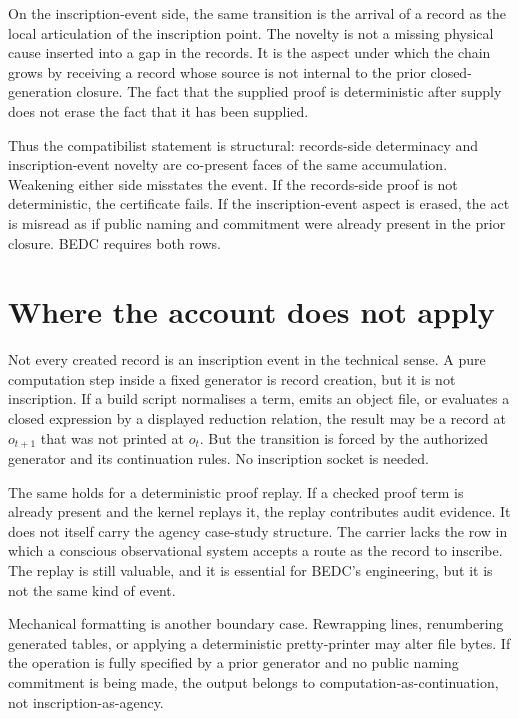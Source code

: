 On the inscription-event side, the same transition is the arrival of a
record as the local articulation of the inscription point.  The novelty is
not a missing physical cause inserted into a gap in the records.  It is the
aspect under which the chain grows by receiving a record whose source is not
internal to the prior closed-generation closure.  The fact that the supplied
proof is deterministic after supply does not erase the fact that it has been
supplied.

Thus the compatibilist statement is structural:
records-side determinacy and inscription-event novelty are co-present faces
of the same accumulation.  Weakening either side misstates the event.  If the
records-side proof is not deterministic, the certificate fails.  If the
inscription-event aspect is erased, the act is misread as if public naming
and commitment were already present in the prior closure.  BEDC requires
both rows.

\section{Where the account does not apply}
\label{sec:inscription-event-non-applications}

Not every created record is an inscription event in the technical sense.  A
pure computation step inside a fixed generator is record creation, but it is
not inscription.  If a build script normalises a term, emits an object file,
or evaluates a closed expression by a displayed reduction relation, the
result may be a record at $o_{t+1}$ that was not printed at $o_t$.  But the
transition is forced by the authorized generator and its continuation rules.
No inscription socket is needed.

The same holds for a deterministic proof replay.  If a checked proof term is
already present and the kernel replays it, the replay contributes audit
evidence.  It does not itself carry the agency case-study structure.  The
carrier lacks the row in which a conscious observational system accepts a
route as the record to inscribe.  The replay is still valuable, and it is
essential for BEDC's engineering, but it is not the same kind of event.

Mechanical formatting is another boundary case.  Rewrapping lines,
renumbering generated tables, or applying a deterministic pretty-printer may
alter file bytes.  If the operation is fully specified by a prior generator
and no public naming commitment is being made, the output belongs to
computation-as-continuation, not inscription-as-agency.

